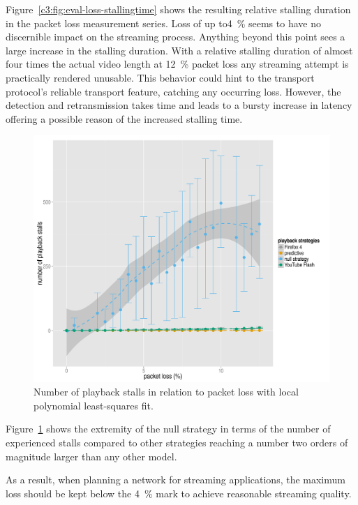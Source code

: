 Figure~\ref{c3:fig:eval-loss-stallingtime} shows the resulting relative stalling duration in the packet loss measurement series. Loss of up to\SI{4}{\percent} seems to have no discernible impact on the streaming process. Anything beyond this point sees a large increase in the stalling duration. With a relative stalling duration of almost four times the actual video length at \SI{12}{\percent} packet loss any streaming attempt is practically rendered unusable. This behavior could hint to the transport protocol's reliable transport feature, catching any occurring loss. However, the detection and retransmission takes time and leads to a bursty increase in latency offering a possible reason of the increased stalling time.


\begin{figure}[htbp]
    \centering
    \includegraphics[width=1.0\textwidth]{images/R-playbackemulation-stallnumber-loss.pdf}
    \caption{Number of playback stalls in relation to packet loss with local polynomial least-squares fit.}
    \label{c3:fig:eval-loss-numstalls}
\end{figure}


Figure~\ref{c3:fig:eval-loss-numstalls} shows the extremity of the null strategy in terms of the number of experienced stalls compared to other strategies reaching a number two orders of magnitude larger than any other model. 


As a result, when planning a network for streaming applications, the maximum loss should be kept below the \SI{4}{\percent} mark to achieve reasonable streaming quality. 


